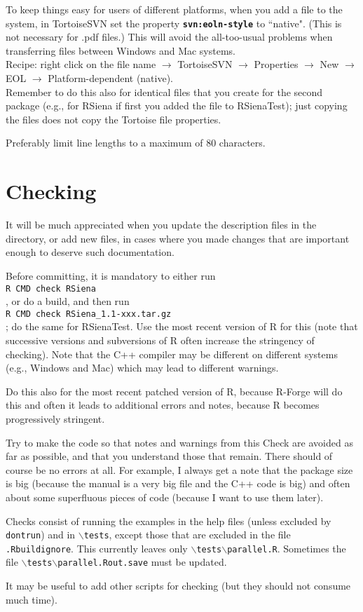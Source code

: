 \documentclass[12pt, a4paper]{article}
\renewcommand{\=}{\,=\,}
\newcommand{\+}{\,+\,}
\newcommand{\sfn}[1]{\textbf{\texttt{#1}}}
\newcommand{\bs}{\backslash}
\newcommand{\RS}{{\sf RSiena }}
\newcommand{\rst}{{\sf RSienaTest}}
\begin{document}
To keep things easy for users of different platforms, when you add a file to the system,
in TortoiseSVN set the property \sfn{svn:eoln-style} to ``native".
(This is not necessary for .pdf files.)
This will avoid the all-too-usual problems when transferring files between Windows and Mac systems.\\
Recipe: right click on the file name $\rightarrow$ TortoiseSVN $\rightarrow$ Properties  $\rightarrow$
New  $\rightarrow$ EOL  $\rightarrow$ Platform-dependent (native).\\
Remember to do this also for identical files that you create for the second package (e.g., for \RS if
first you added the file to \rst); just copying the files does not copy
the Tortoise file properties.

Preferably limit line lengths to a maximum of 80 characters.

\section{Checking}


 It will be much appreciated when you update the description files in
 the  directory, or add new files, in cases where you made changes that are
 important enough to deserve such documentation.

  Before committing, it is mandatory to either run \\
  \verb|R CMD check RSiena|\\
  , or do a build, and then run \\
  \verb|R CMD check RSiena_1.1-xxx.tar.gz|\\
  ; do the same for \rst.
  Use the most recent version of R for this (note that
  successive versions and subversions of R often increase the stringency of checking).
  Note that the C++ compiler may be different on different systems (e.g., Windows and Mac)
  which may lead to different warnings.

  Do this also for the most recent patched version of R, because R-Forge will do this
  and often it leads to additional errors and notes, because R becomes progressively
  stringent.

  Try to make the code so that notes and warnings from this Check are avoided as far as possible,
  and that you understand those that remain.
  There should of course be no errors at all.
  For example, I always get a note that the package size is big
  (because the manual is a very big file and the C++ code is big) and
  often about some superfluous pieces of code (because I want to use them later).

  Checks consist of running the examples in the help files (unless excluded by \texttt{dontrun})
  and in \texttt{$\bs$tests}, except those that are excluded in the file \texttt{.Rbuildignore}.
  This currently leaves only \texttt{$\bs$tests$\bs$parallel.R}.
  Sometimes the file \texttt{$\bs$tests$\bs$parallel.Rout.save} must be updated.

  It may be useful to add other scripts for checking (but they should not consume much time).
\end{document}
